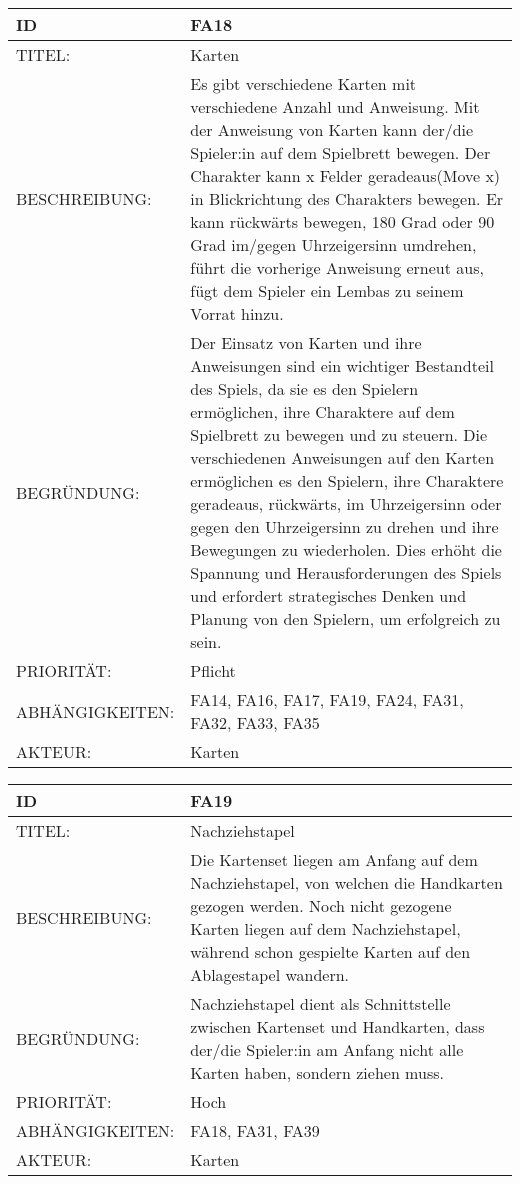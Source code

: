 \documentclass{uulm-assignment}
\begin{document}
    \begin{tabularx}{\textwidth}{|l|X |} \hline
        \textbf{ID} & \textbf{FA18} \\
        \hline
        TITEL: &  Karten\\
        \hline
        BESCHREIBUNG: &  Es gibt verschiedene Karten mit verschiedene Anzahl und Anweisung. Mit der Anweisung von Karten kann der/die Spieler:in auf dem Spielbrett bewegen. Der Charakter kann x Felder geradeaus(Move x) in Blickrichtung des Charakters bewegen. Er kann rückwärts bewegen, 180 Grad oder 90 Grad im/gegen Uhrzeigersinn umdrehen, führt die vorherige Anweisung erneut aus, fügt dem Spieler ein Lembas zu seinem Vorrat hinzu.
        \\
        \hline
        BEGRÜNDUNG: & Der Einsatz von Karten und ihre Anweisungen sind ein wichtiger Bestandteil des Spiels, da sie es den Spielern ermöglichen, ihre Charaktere auf dem Spielbrett zu bewegen und zu steuern. Die verschiedenen Anweisungen auf den Karten ermöglichen es den Spielern, ihre Charaktere geradeaus, rückwärts, im Uhrzeigersinn oder gegen den Uhrzeigersinn zu drehen und ihre Bewegungen zu wiederholen. Dies erhöht die Spannung und Herausforderungen des Spiels und erfordert strategisches Denken und Planung von den Spielern, um erfolgreich zu sein.\\
        \hline
        PRIORITÄT: & Pflicht\\
        \hline
        ABHÄNGIGKEITEN: & FA14, FA16, FA17, FA19, FA24, FA31, FA32, FA33, FA35\\
        \hline
        AKTEUR: & Karten\\
        \hline
    \end{tabularx}
    
    \begin{tabularx}{\textwidth}{|l|X |} \hline
        \textbf{ID} & \textbf{FA19} \\
        \hline
        TITEL: &  Nachziehstapel\\
        \hline
        BESCHREIBUNG: & Die Kartenset liegen am Anfang auf dem Nachziehstapel, von welchen die Handkarten gezogen werden. Noch nicht gezogene Karten liegen auf dem Nachziehstapel, während schon gespielte Karten auf den Ablagestapel wandern.
        \\
        \hline
        BEGRÜNDUNG: & Nachziehstapel dient als Schnittstelle zwischen Kartenset und Handkarten, dass der/die Spieler:in am Anfang nicht alle Karten haben, sondern ziehen muss.\\
        \hline
        PRIORITÄT: & Hoch\\
        \hline
        ABHÄNGIGKEITEN: & FA18, FA31, FA39\\
        \hline
        AKTEUR: & Karten\\
        \hline
    \end{tabularx}
    
\end{document}
